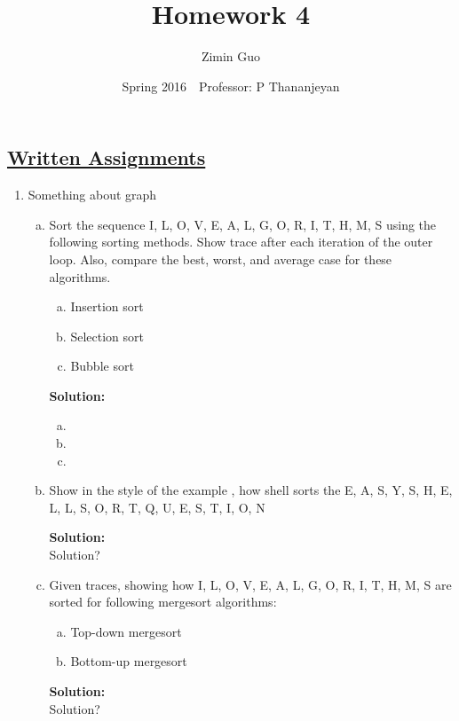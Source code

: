 \documentclass{article}\usepackage{amsmath,amssymb,amsthm,tikz,tkz-graph,color,chngpage,soul,hyperref,csquotes,graphicx,floatrow}\newcommand*{\QEDB}{\hfill\ensuremath{\square}}\newtheorem*{prop}{Proposition}\renewcommand{\theenumi}{\alph{enumi}}\usepackage[shortlabels]{enumitem}\usepackage[nobreak=true]{mdframed}\usetikzlibrary{matrix,calc}\MakeOuterQuote{"}\usepackage[margin=0.75in]{geometry} \newtheorem{theorem}{Theorem}
\title{Homework 4}
\author{Zimin Guo }
\date{Spring 2016$\quad$Professor: P Thananjeyan}
\begin{document}
\maketitle


\subsection*{\underline{Written Assignments}}
\begin{enumerate}[1.]
\item Something about graph
\begin{enumerate}[a)]
\item Sort the sequence I, L, O, V, E, A, L, G, O, R, I, T, H, M, S using the following sorting methods. Show trace after each iteration of the outer loop. Also, compare the best, worst, and average case for these algorithms.
\begin{enumerate}[a.]
\item Insertion sort
\item Selection sort
\item Bubble sort
\end{enumerate}
\begin{mdframed}
\textbf{Solution:} 
\begin{enumerate}[a.]
\item
\item
\item
\end{enumerate}
\end{mdframed}

\item Show in the style of the example , how shell sorts the E, A, S, Y, S, H, E, L, L, S, O, R, T, Q, U, E, S, T, I, O, N
\begin{mdframed}
\textbf{Solution:} \\
Solution?
\end{mdframed}

\item Given traces, showing how I, L, O, V, E, A, L, G, O, R, I, T, H, M, S are sorted for following mergesort algorithms:
\begin{enumerate}[a.]
\item Top-down mergesort
\item Bottom-up mergesort
\end{enumerate}
\begin{mdframed}
\textbf{Solution:} \\
Solution?
\end{mdframed}


\end{enumerate}
\end{enumerate}
\end{document}
